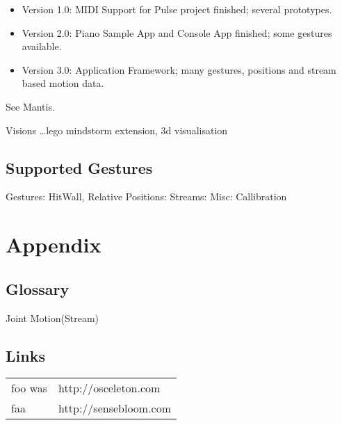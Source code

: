 \documentclass[a4paper,12pt]{article}
\begin{document}
\begin{itemize}
	\item Version 1.0: MIDI Support for Pulse project finished; several prototypes.
	\item Version 2.0: Piano Sample App and Console App finished; some gestures available.
	\item Version 3.0: Application Framework; many gestures, positions and stream based motion data.
\end{itemize}

See Mantis.

Visions \ldots lego mindstorm extension, 3d visualisation


\subsection{Supported Gestures}

Gestures: HitWall, Relative
Positions: 
Streams: 
Misc: Callibration

\section{Appendix}

\subsection*{Glossary}

Joint
Motion(Stream)



\subsection*{Links}

\begin{tabular}{ll}
	foo was & http://osceleton.com \\
	faa & http://sensebloom.com
\end{tabular}
\end{document}
